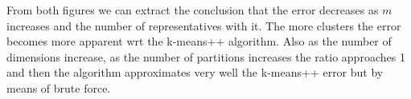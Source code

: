 From both figures we can extract the conclusion that the error decreases as $m$ increases and the number of representatives with it. The more clusters the error becomes more apparent wrt the k-means++ algorithm. Also as the number of dimensions increase, as the number of partitions increases the ratio approaches 1 and then the algorithm approximates very well the k-means++ error but by means of brute force.
